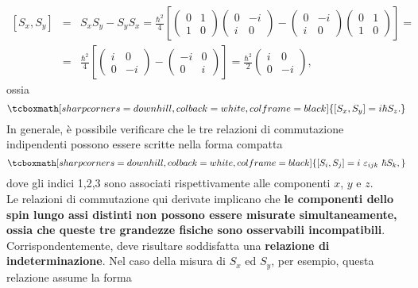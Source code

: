 \documentclass[a4paper,12pt,oneside]{book}
\begin{document}
	\begin{eqnarray}
		\left[ S_x , S_y \right] & = & S_x S_y-S_y S_x= 
		\frac{\hbar ^2}{4} \left[\begin{pmatrix}
		0 & 1\\
		1 & 0
		\end{pmatrix} \begin{pmatrix}
		0 & -i\\
		i & 0
		\end{pmatrix}- \begin{pmatrix}
		0 & -i\\
		i & 0
		\end{pmatrix}\begin{pmatrix}
		0 & 1\\
		1 & 0
		\end{pmatrix}
		\right] = \nonumber \\
		& = &\frac{\hbar ^2}{4} \left[\begin{pmatrix}
		i & 0\\
		0 & -i
		\end{pmatrix} - \begin{pmatrix}
		-i & 0\\
		0 & i
		\end{pmatrix}\right] = 	
		\frac{\hbar ^2}{2}\begin{pmatrix}
		i & 0\\
		0 & -i
		\end{pmatrix},
	\end{eqnarray}
ossia
	\begin{equation}
		\tcboxmath[sharp corners=downhill, colback=white, colframe=black]{
			\left[ S_x, S_y \right] = i \hbar S_z.
			}
	\end{equation}
In generale, è possibile verificare che le tre relazioni di commutazione indipendenti possono essere scritte nella forma compatta
	\begin{equation}
		\tcboxmath[sharp corners=downhill, colback=white, colframe=black]{
			\left[ S_i , S_j\right] = i\ \varepsilon_{ijk}\ \hbar S_k,
			}
	\end{equation}
dove gli indici 1,2,3 sono associati rispettivamente alle componenti $x$, $y$ e $z$.\\
Le relazioni di commutazione qui derivate implicano che \textbf{le componenti dello spin lungo assi distinti non possono essere misurate simultaneamente, ossia che queste tre grandezze fisiche sono osservabili incompatibili}. Corrispondentemente, deve risultare soddisfatta una \textbf{relazione di indeterminazione}. Nel caso della misura di $S_x$ ed $S_y$, per esempio, questa relazione assume la forma
\end{document}
